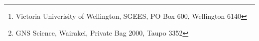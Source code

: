 \author{Chet Hopp\footnote{\label{note1}Victoria Univerisity of Wellington, SGEES, PO Box 600, Wellington 6140} \and Martha Savage\footnotemark[1] \and John Townend\footnotemark[1], Steve Sherburn\footnote{GNS Science, Wairakei, Private Bag 2000, Taupo 3352}}